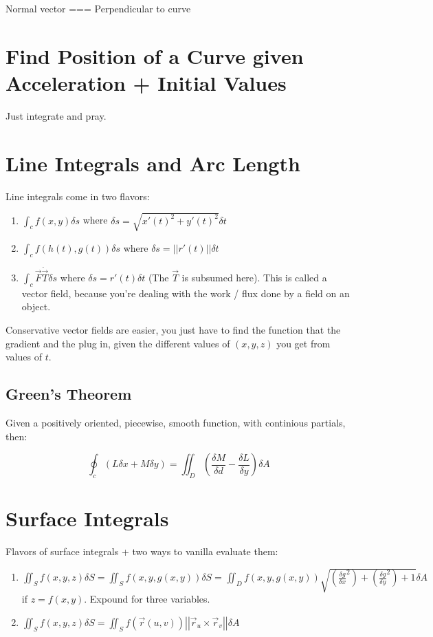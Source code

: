 \documentclass{article}
\begin{document}
Normal vector === Perpendicular to curve

\section{Find Position of a Curve given Acceleration + Initial Values}

Just integrate and pray.


\section{Line Integrals and Arc Length}

Line integrals come in two flavors:

\begin{enumerate}
    \item  $\int_c f(x, y) \delta s$ where $\delta s = \sqrt{x'(t)^2 + y'(t)^2} \delta t$
    \item $\int_c f(h(t), g(t)) \delta s$ where $\delta s = \left|\left|r'(t)\right|\right| \delta t$
    \item  $\int_c \vec{F} \dot \vec{T} \delta s$ where $\delta s = r'(t) \delta t$ (The $\vec{T}$ is subsumed here). This is called a vector field, because you're dealing with the work / flux done by a field on an object.
\end{enumerate}

Conservative vector fields are easier, you just have to find the function that the gradient and the plug in, given the different values of $(x, y, z)$ you get from values of $t$.

\subsection{Green's Theorem}

Given a positively oriented, piecewise, smooth function, with continious partials, then:

$$ \oint_c (L \delta x + M\delta y) = \iint_D (\frac{\delta M}{\delta d} - \frac{\delta L}{\delta y})\delta A$$

\section{Surface Integrals}

Flavors of surface integrals + two ways to vanilla evaluate them:

\begin{enumerate}
    \item $\iint_S f(x, y, z) \delta S = \iint_S f(x, y, g(x, y)) \delta S = \iint_D f(x, y, g(x, y)) \sqrt{(\frac{\delta g}{\delta x}^2) + (\frac{\delta g}{\delta y}^2) + 1} \delta A$ if $z = f(x, y)$. Expound for three variables.
    \item $\iint_S f(x, y, z) \delta S = \iint_S f(\vec{r}(u, v)) \left|\left|\vec{r}_u \times \vec{r}_v \right|\right| \delta A $
\end{enumerate}
\end{document}
